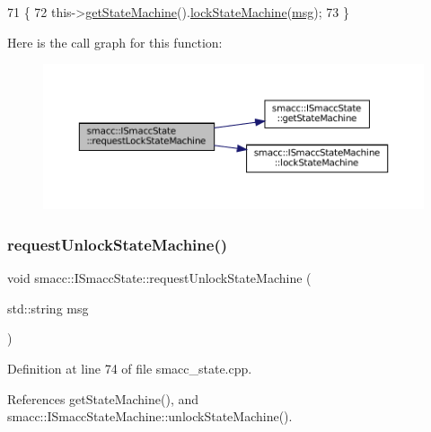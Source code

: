 \begin{DoxyCode}
71 \{
72     this->\hyperlink{classsmacc_1_1ISmaccState_a562bb3f9a3ac16b8be71e4794c9e7523}{getStateMachine}().\hyperlink{classsmacc_1_1ISmaccStateMachine_a5c8d4c9a4b11c7950266a00e48080ce3}{lockStateMachine}(\hyperlink{namespacebattery__monitor__node_ab1920c64448816edd4064e494275fdff}{msg});
73 \}
\end{DoxyCode}
Here is the call graph for this function\+:
\nopagebreak
\begin{figure}[H]
\begin{center}
\leavevmode
\includegraphics[width=350pt]{classsmacc_1_1ISmaccState_ae733140761345e027713bd622d93bf0f_cgraph}
\end{center}
\end{figure}
\mbox{\label{classsmacc_1_1ISmaccState_a3bf006f25d5b9c0534c8e89ae2e93d40}} 
\subsubsection{\texorpdfstring{request\+Unlock\+State\+Machine()}{requestUnlockStateMachine()}}
{\footnotesize\ttfamily void smacc\+::\+I\+Smacc\+State\+::request\+Unlock\+State\+Machine (\begin{DoxyParamCaption}\item[{std\+::string}]{msg }\end{DoxyParamCaption})\hspace{0.3cm}{\ttfamily [protected]}}



Definition at line 74 of file smacc\+\_\+state.\+cpp.



References get\+State\+Machine(), and smacc\+::\+I\+Smacc\+State\+Machine\+::unlock\+State\+Machine().


